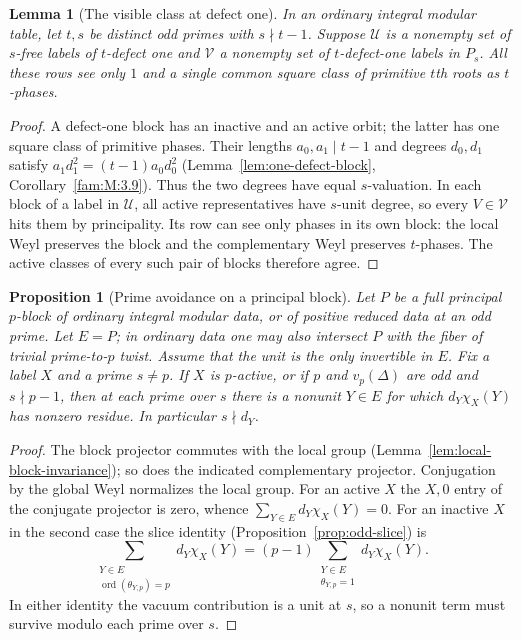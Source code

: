 \documentclass[11pt,a4paper]{article}
\numberwithin{equation}{section}
\newtheorem{proposition}[theorem]{Proposition}
\newtheorem{lemma}[theorem]{Lemma}
\theoremstyle{remark}
\DeclareMathOperator{\ord}{ord}
\begin{document}
\begin{lemma}[The visible class at defect one]\label{lem:quintic-common-class}
In an ordinary integral modular table, let $t,s$ be distinct odd primes
with $s\nmid t-1$. Suppose $\mathcal U$ is a nonempty set of
$s$-free labels of $t$-defect one and $\mathcal V$ a nonempty set of
$t$-defect-one labels in $P_s$. All these rows see only $1$ and a
single common square class of primitive $t$th roots as $t$-phases.
\end{lemma}
\begin{proof}
A defect-one block has an inactive and an active orbit; the latter
has one square class of primitive phases. Their lengths
$a_0,a_1\mid t-1$ and degrees $d_0,d_1$ satisfy
$a_1d_1^2=(t-1)a_0d_0^2$
(Lemma~\ref{lem:one-defect-block}, Corollary~\ref{fam:M:3.9}).
Thus the two degrees have equal $s$-valuation. In each block of a label
in $\mathcal U$, all active representatives have $s$-unit degree, so
every $V\in\mathcal V$ hits them by principality. Its row can see
only phases in its own block: the local Weyl preserves the block
and the complementary Weyl preserves $t$-phases. The active classes
of every such pair of blocks therefore agree.
\end{proof}

\begin{proposition}[Prime avoidance on a principal block]\label{prop:principal-support}
Let $P$ be a full principal $p$-block of ordinary integral modular data,
or of positive reduced data at an odd prime. Let $E=P$; in ordinary
data one may also intersect $P$ with the fiber of trivial
prime-to-$p$ twist. Assume that the unit is the only invertible in
$E$. Fix a label $X$ and a prime $s\ne p$. If $X$ is $p$-active,
or if $p$ and $v_p(\Delta)$ are odd and $s\nmid p-1$, then at each
prime over $s$ there is a nonunit $Y\in E$ for which
$d_Y\chi_X(Y)$ has nonzero residue. In particular $s\nmid d_Y$.
\end{proposition}
\begin{proof}
The block projector commutes with the local group
(Lemma~\ref{lem:local-block-invariance}); so does the indicated
complementary projector. Conjugation by the global Weyl normalizes
the local group. For an active $X$ the $X,0$ entry of the conjugate
projector is zero, whence $\sum_{Y\in E}d_Y\chi_X(Y)=0$.
For an inactive $X$ in the second case the slice identity
(Proposition~\ref{prop:odd-slice}) is
\[
 \sum_{\substack{Y\in E\\\ord(\theta_{Y,p})=p}}d_Y\chi_X(Y)
 =(p-1)\sum_{\substack{Y\in E\\\theta_{Y,p}=1}}d_Y\chi_X(Y).
\]
In either identity the vacuum contribution is a unit at $s$, so a
nonunit term must survive modulo each prime over $s$.
\end{proof}
\end{document}
